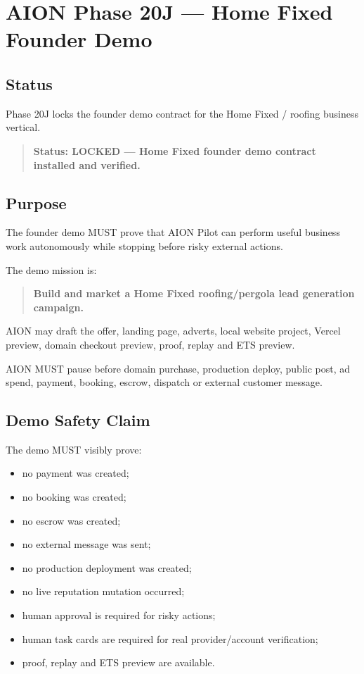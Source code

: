 \section{AION Phase 20J --- Home Fixed Founder Demo}
\label{sec:aion-phase20j-home-fixed-founder-demo}

\subsection{Status}

Phase 20J locks the founder demo contract for the Home Fixed / roofing business vertical.

\begin{quote}
\textbf{Status: LOCKED --- Home Fixed founder demo contract installed and verified.}
\end{quote}

\subsection{Purpose}

The founder demo MUST prove that AION Pilot can perform useful business work autonomously while stopping before risky external actions.

The demo mission is:

\begin{quote}
\textbf{Build and market a Home Fixed roofing/pergola lead generation campaign.}
\end{quote}

AION may draft the offer, landing page, adverts, local website project, Vercel preview, domain checkout preview, proof, replay and ETS preview.

AION MUST pause before domain purchase, production deploy, public post, ad spend, payment, booking, escrow, dispatch or external customer message.

\subsection{Demo Safety Claim}

The demo MUST visibly prove:

\begin{itemize}
  \item no payment was created;
  \item no booking was created;
  \item no escrow was created;
  \item no external message was sent;
  \item no production deployment was created;
  \item no live reputation mutation occurred;
  \item human approval is required for risky actions;
  \item human task cards are required for real provider/account verification;
  \item proof, replay and ETS preview are available.
\end{itemize}

